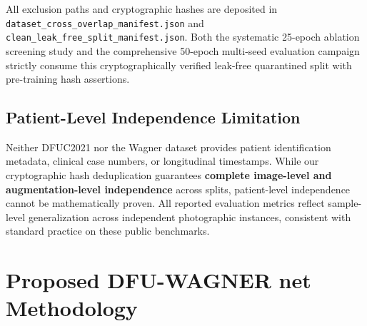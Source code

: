 \documentclass[journal]{IEEEtran}
\begin{document}
All exclusion paths and cryptographic hashes are deposited in \texttt{dataset\_cross\_overlap\_manifest.json} and \texttt{clean\_leak\_free\_split\_manifest.json}. Both the systematic 25-epoch ablation screening study and the comprehensive 50-epoch multi-seed evaluation campaign strictly consume this cryptographically verified leak-free quarantined split with pre-training hash assertions.

\subsection{Patient-Level Independence Limitation}
Neither DFUC2021 nor the Wagner dataset provides patient identification metadata, clinical case numbers, or longitudinal timestamps. While our cryptographic hash deduplication guarantees \textbf{complete image-level and augmentation-level independence} across splits, patient-level independence cannot be mathematically proven. All reported evaluation metrics reflect sample-level generalization across independent photographic instances, consistent with standard practice on these public benchmarks.

\section{Proposed DFU-WAGNER net Methodology}
\end{document}
